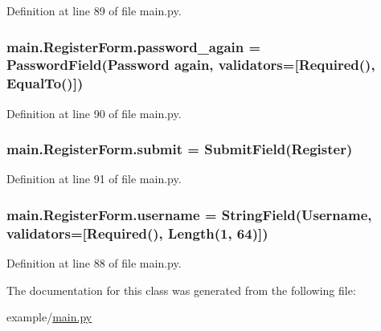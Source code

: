 Definition at line 89 of file main.\+py.

\subsubsection[{\texorpdfstring{password\+\_\+again}{password_again}}]{\setlength{\rightskip}{0pt plus 5cm}main.\+Register\+Form.\+password\+\_\+again = Password\+Field(\textquotesingle{}Password again\textquotesingle{}, validators=\mbox{[}Required(), Equal\+To(\textquotesingle{})\mbox{]})\hspace{0.3cm}{\ttfamily [static]}}\hypertarget{classmain_1_1RegisterForm_a045a58303acc98394aedb828655268ab}{}\label{classmain_1_1RegisterForm_a045a58303acc98394aedb828655268ab}


Definition at line 90 of file main.\+py.

\subsubsection[{\texorpdfstring{submit}{submit}}]{\setlength{\rightskip}{0pt plus 5cm}main.\+Register\+Form.\+submit = Submit\+Field(\textquotesingle{}Register\textquotesingle{})\hspace{0.3cm}{\ttfamily [static]}}\hypertarget{classmain_1_1RegisterForm_a1d788d2aac9c4ac25887eb8b2072d170}{}\label{classmain_1_1RegisterForm_a1d788d2aac9c4ac25887eb8b2072d170}


Definition at line 91 of file main.\+py.

\subsubsection[{\texorpdfstring{username}{username}}]{\setlength{\rightskip}{0pt plus 5cm}main.\+Register\+Form.\+username = String\+Field(\textquotesingle{}Username\textquotesingle{}, validators=\mbox{[}Required(), Length(1, 64)\mbox{]})\hspace{0.3cm}{\ttfamily [static]}}\hypertarget{classmain_1_1RegisterForm_a358e684fade440a73243b01b69778fe9}{}\label{classmain_1_1RegisterForm_a358e684fade440a73243b01b69778fe9}


Definition at line 88 of file main.\+py.



The documentation for this class was generated from the following file\+:\begin{DoxyCompactItemize}
\item 
example/\hyperlink{main_8py}{main.\+py}\end{DoxyCompactItemize}
